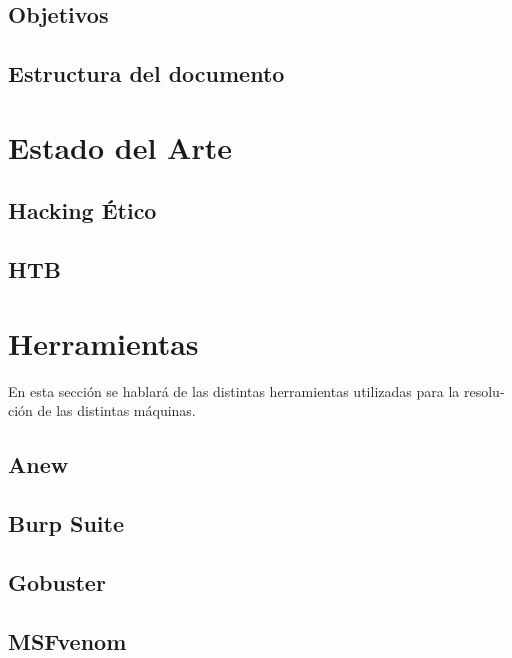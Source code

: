 \documentclass[a4paper, 12pt]{article} %
\begin{document}
\begin{otherlanguage}{spanish}
    \subsection{Objetivos}
    

    \subsection{Estructura del documento}
    

    \newpage
    \section{Estado del Arte}

    \subsection{Hacking Ético}
    

    \subsection{\acrlong{HTB}}
    

    \newpage
    \section{Herramientas}
    En esta sección se hablará de las distintas herramientas utilizadas para la resolución de las distintas máquinas.

    \subsection{Anew}
    

    \subsection{Burp Suite}
    

    \subsection{Gobuster}
    

    \subsection{MSFvenom}
    


\end{otherlanguage}
\end{document}

